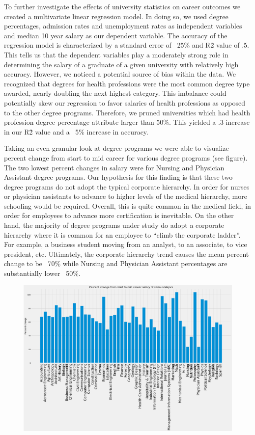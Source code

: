 To further investigate the effects of university statistics on career outcomes we created a multivariate linear regression model.
In doing so, we used degree percentages, admission rates and unemployment rates as independent variables and median 10 year salary as our dependent variable.
The accuracy of the regression model is characterized by a standard error of ~25\% and R\^2 value of .5. This tells us that the dependent variables play a moderately strong role in determining the salary of a graduate of a given university with relatively high accuracy. However, we noticed a potential source of bias within the data. We recognized that degrees for health professions were the most common degree type awarded, nearly doubling the next highest category. This imbalance could potentially skew our regression to favor salaries of health professions as opposed to the other degree programs. Therefore, we pruned universities which had health profession degree percentage attribute larger than 50\%. This yielded a .3 increase in our R\^2 value and a ~5\% increase in accuracy.

Taking an even granular look at degree programs we were able to visualize percent change from start to mid career for various degree programs (see figure). The two lowest percent changes in salary were for Nursing and Physician Assistant degree programs. Our hypothesis for this finding is that these two degree programs do not adopt the typical corporate hierarchy. In order for nurses or physician assistants to advance to higher levels of the medical hierarchy, more schooling would be required. Overall, this is quite common in the medical field, in order for employees to advance more certification is inevitable. On the other hand, the majority of degree programs under study do adopt a corporate hierarchy where it is common for an employee to  “climb the corporate ladder”. For example, a business student moving from an analyst, to an associate, to vice president, etc. Ultimately, the corporate hierarchy trend causes the mean percent change to be ~70\% while Nursing and Physician Assistant percentages are substantially lower ~50\%. 
\begin{figure} 
	  \includegraphics[width=\textwidth]{images/major_pct_chg.png}
	\label{fig:test3}
\end{figure}


